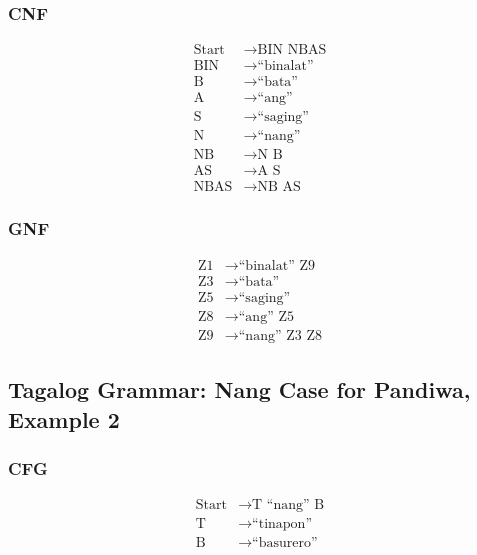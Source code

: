 \subsubsection{CNF}
\begin{equation*}
    \begin{aligned}
        \text{Start}   & \rightarrow \text{BIN NBAS}   \\
        \text{BIN} & \rightarrow \text{“binalat”} \\
        \text{B} & \rightarrow \text{“bata”} \\
        \text{A} & \rightarrow \text{“ang”} \\
        \text{S} & \rightarrow \text{“saging”} \\
        \text{N} & \rightarrow \text{“nang”} \\
        \text{NB} & \rightarrow \text{N B} \\
        \text{AS} & \rightarrow \text{A S} \\
        \text{NBAS} & \rightarrow \text{NB AS}
    \end{aligned}
\end{equation*}

\subsubsection{GNF}
\begin{equation*}
    \begin{aligned}
        \text{Z1}   & \rightarrow \text{“binalat” Z9}   \\
        \text{Z3} & \rightarrow \text{“bata”} \\
        \text{Z5} & \rightarrow \text{“saging”} \\
        \text{Z8} & \rightarrow \text{“ang” Z5} \\
        \text{Z9} & \rightarrow \text{“nang” Z3 Z8}
    \end{aligned}
\end{equation*}

\newpage
\subsection{Tagalog Grammar: Nang Case for Pandiwa, Example 2}
\subsubsection{CFG}
\begin{equation*}
    \begin{aligned}
        \text{Start}   & \rightarrow \text{T “nang” B}   \\
        \text{T} & \rightarrow \text{“tinapon”} \\
        \text{B} & \rightarrow \text{“basurero”}
    \end{aligned}
\end{equation*}

